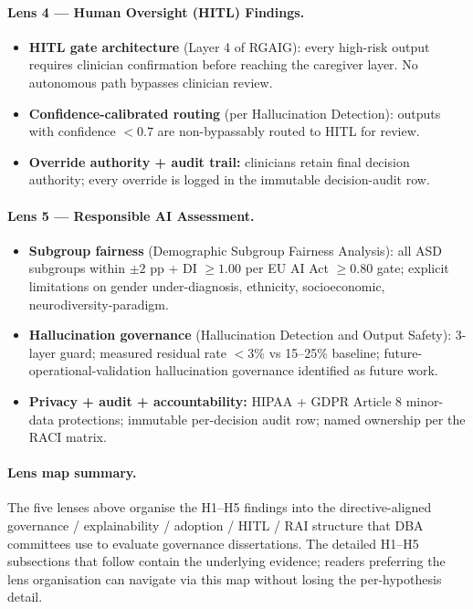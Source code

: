 \paragraph{Lens 4 --- Human Oversight (HITL) Findings.}
\label{para:lens_human_oversight}
\begin{itemize}[leftmargin=*, itemsep=3pt]
    \item \textbf{HITL gate architecture} (Layer 4 of RGAIG): every high-risk output requires clinician confirmation before reaching the caregiver layer. No autonomous path bypasses clinician review.
    \item \textbf{Confidence-calibrated routing} (per Hallucination Detection): outputs with confidence $< 0.7$ are non-bypassably routed to HITL for review.
    \item \textbf{Override authority + audit trail:} clinicians retain final decision authority; every override is logged in the immutable decision-audit row.
\end{itemize}

\paragraph{Lens 5 --- Responsible AI Assessment.}
\label{para:lens_rai}
\begin{itemize}[leftmargin=*, itemsep=3pt]
    \item \textbf{Subgroup fairness} (Demographic Subgroup Fairness Analysis): all ASD subgroups within $\pm 2$ pp + DI $\geq 1.00$ per EU AI Act $\geq 0.80$ gate; explicit limitations on gender under-diagnosis, ethnicity, socioeconomic, neurodiversity-paradigm.
    \item \textbf{Hallucination governance} (Hallucination Detection and Output Safety): 3-layer guard; measured residual rate $< 3$\% vs 15--25\% baseline; future-operational-validation hallucination governance identified as future work.
    \item \textbf{Privacy + audit + accountability:} HIPAA + GDPR Article 8 minor-data protections; immutable per-decision audit row; named ownership per the RACI matrix.
\end{itemize}

\paragraph{Lens map summary.} The five lenses above organise the H1--H5 findings into the directive-aligned governance / explainability / adoption / HITL / RAI structure that DBA committees use to evaluate governance dissertations. The detailed H1--H5 subsections that follow contain the underlying evidence; readers preferring the lens organisation can navigate via this map without losing the per-hypothesis detail.

